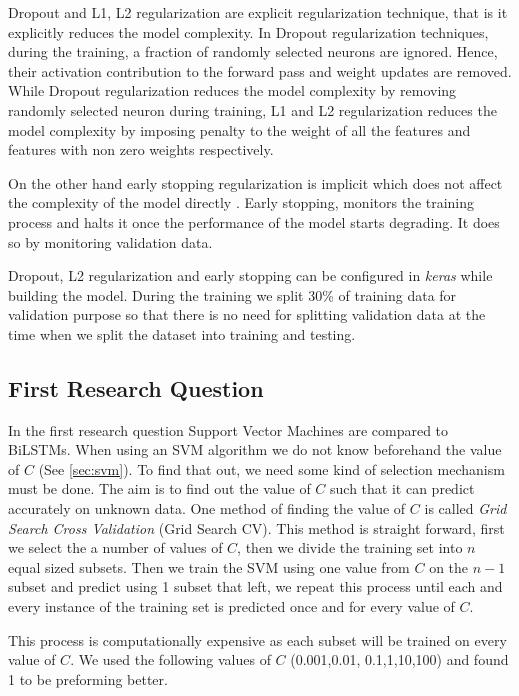 Dropout and L1, L2 regularization are explicit regularization technique, that is it explicitly reduces the model complexity. In Dropout regularization techniques, during the training, a fraction of randomly selected neurons are ignored. Hence, their activation contribution to the forward pass and weight updates are removed. While Dropout regularization reduces the model complexity by removing randomly selected neuron during training, L1 and L2 regularization reduces the model complexity by imposing penalty to the weight of all the features and features with non zero weights respectively.      

On the other hand early stopping regularization is implicit which does not affect the complexity of the model directly \cite{zhang2016understanding}. Early stopping, monitors the training process and halts it once the performance of the model starts degrading. It does so by monitoring validation data. 


Dropout, L2 regularization and early stopping can be configured in \textit{keras} while building the model. During the training we split 30\% of training data for validation purpose so that there is no need for splitting validation data at the time when we split the dataset into training and testing.

\subsection{First Research Question} \label{impQuestion1}

In the first research question Support Vector Machines are compared to \glspl{BiLSTM}. When using an \gls{SVM} algorithm we do not know beforehand the value of $C$ (See \ref{sec:svm}). To find that out, we need some kind of selection mechanism must be done. The aim is to find out the value of $C$ such that it can predict accurately on unknown data. One method of finding the value of $C$ is called \textit{Grid Search Cross Validation} (Grid Search CV). This method is straight forward, first we select the a number of values of $C$, then we divide the training set into $n$ equal sized subsets. Then we train the \gls{SVM} using one value from $C$ on the $n-1$ subset and predict using 1 subset that left, we repeat this process until each and every instance of the training set is predicted once and for every value of $C$.

This process is computationally expensive as each subset will be trained on every value of $C$. We used the following values of $C$ (0.001,0.01, 0.1,1,10,100) and found 1 to be preforming better.

